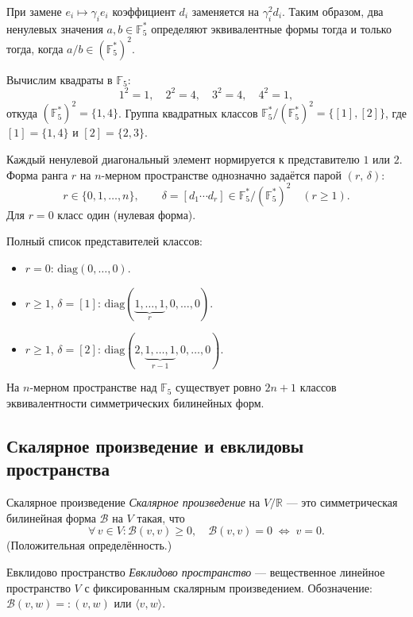 При замене $e_i \mapsto \gamma_i e_i$ коэффициент $d_i$ заменяется на $\gamma_i^2 d_i$.
Таким образом, два ненулевых значения $a, b \in \mathbb{F}_5^*$ определяют эквивалентные формы тогда и только тогда, когда $a/b \in (\mathbb{F}_5^*)^2$.

Вычислим квадраты в $\mathbb{F}_5$:
\[
1^2 = 1,\quad 2^2 = 4,\quad 3^2 = 4,\quad 4^2 = 1,
\]
откуда $(\mathbb{F}_5^*)^2 = \{1, 4\}$.
Группа квадратных классов $\mathbb{F}_5^*/(\mathbb{F}_5^*)^2 = \{[1], [2]\}$, где $[1] = \{1,4\}$ и $[2] = \{2,3\}$.

Каждый ненулевой диагональный элемент нормируется к представителю $1$ или $2$.
Форма ранга $r$ на $n$-мерном пространстве однозначно задаётся парой $(r,\,\delta)$:
\[
r \in \{0,1,\ldots,n\}, \qquad
\delta = [d_1\cdots d_r] \in \mathbb{F}_5^*/(\mathbb{F}_5^*)^2 \quad (r \geq 1).
\]
Для $r = 0$ класс один (нулевая форма).

Полный список представителей классов:
\begin{itemize}
	\item $r = 0$: $\mathrm{diag}(0,\ldots,0)$.
	\item $r \geq 1$, $\delta = [1]$: $\mathrm{diag}(\underbrace{1,\ldots,1}_{r},0,\ldots,0)$.
	\item $r \geq 1$, $\delta = [2]$: $\mathrm{diag}(2,\underbrace{1,\ldots,1}_{r-1},0,\ldots,0)$.
\end{itemize}

\begin{Statement}{}{}
	На $n$-мерном пространстве над $\mathbb{F}_5$ существует ровно $2n+1$ классов эквивалентности симметрических билинейных форм.
\end{Statement}

\subsection{Скалярное произведение и евклидовы пространства}

\begin{Definition}{Скалярное произведение}{}
	\textit{Скалярное произведение} на $V/\mathbb{R}$ — это симметрическая билинейная форма $\mathcal{B}$ на $V$ такая, что
	\[
	\forall\, v \in V\colon \mathcal{B}(v,v) \geq 0, \quad \mathcal{B}(v,v) = 0 \;\Longleftrightarrow\; v = 0.
	\]
	(Положительная определённость.)
\end{Definition}

\begin{Definition}{Евклидово пространство}{}
	\textit{Евклидово пространство} — вещественное линейное пространство $V$ с фиксированным скалярным произведением. Обозначение: $\mathcal{B}(v, w) =: (v, w)$ или $\langle v, w \rangle$.
\end{Definition}

